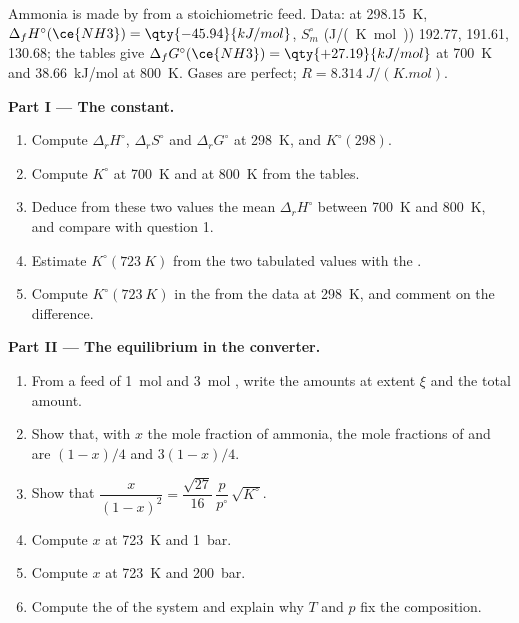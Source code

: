 \begin{problem}
\label{pb:b2:equilibrium-shifts:1}
Ammonia is made by  from a stoichiometric feed.
Data: at \qty{298.15}{K}, $\Delta_f H^\circ(\ce{NH3}) = \qty{-45.94}{kJ/mol}$,
$S^\circ_m$ (\unit{J/(K.mol)})  192.77,  191.61,  130.68;
the tables give $\Delta_f G^\circ(\ce{NH3}) = \qty{+27.19}{kJ/mol}$ at
\qty{700}{K} and \qty{+38.66}{kJ/mol} at \qty{800}{K}. Gases are perfect;
$R = \qty{8.314}{J/(K.mol)}$.

\medskip
\noindent\textbf{Part I --- The constant.}
\begin{enumerate}
  \item Compute $\Delta_r H^\circ$, $\Delta_r S^\circ$ and $\Delta_r G^\circ$ at
        \qty{298}{K}, and $K^\circ(298)$.
  \item Compute $K^\circ$ at \qty{700}{K} and at \qty{800}{K} from the tables.
  \item Deduce from these two values the mean $\Delta_r H^\circ$ between
        \qty{700}{K} and \qty{800}{K}, and compare with question 1.
  \item Estimate $K^\circ(\qty{723}{K})$ from the two tabulated values with
        the .
  \item Compute $K^\circ(\qty{723}{K})$ in the  from
        the data at \qty{298}{K}, and comment on the difference.
\end{enumerate}

\medskip
\noindent\textbf{Part II --- The equilibrium in the converter.}
\begin{enumerate}[resume]
  \item From a feed of \qty{1}{mol}  and \qty{3}{mol} , write the
        amounts at extent $\xi$ and the total amount.
  \item Show that, with $x$ the mole fraction of ammonia, the mole fractions
        of  and  are $(1-x)/4$ and $3(1-x)/4$.
  \item Show that $\dfrac{x}{(1-x)^2} = \dfrac{\sqrt{27}}{16}\,\dfrac{p}{p^\circ}\,
        \sqrt{K^\circ}$.
  \item Compute $x$ at \qty{723}{K} and \qty{1}{bar}.
  \item Compute $x$ at \qty{723}{K} and \qty{200}{bar}.
  \item Compute the  of the system and explain why $T$ and $p$ fix the
        composition.
\end{enumerate}


\end{problem}
